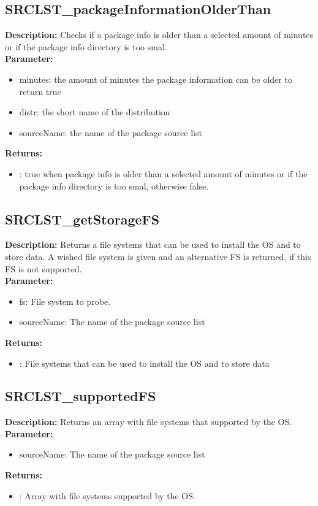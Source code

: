 \subsection{SRCLST\_packageInformationOlderThan}
\textbf{Description:} Checks if a package info is older than a selected amount of minutes or if the package info directory is too smal.\\
\textbf{Parameter:}
\begin{itemize}
\item minutes: the amount of minutes the package information can be older to return true
\item distr: the short name of the distribution
\item sourceName: the name of the package source list
\end{itemize}
\textbf{Returns:}
\begin{itemize}
\item : true when package info is older than a selected amount of minutes or if the package info directory is too smal, otherwise false.
\end{itemize}

\subsection{SRCLST\_getStorageFS}
\textbf{Description:} Returns a file systems that can be used to install the OS and to store data. A wished file system is given and an alternative FS is returned, if this FS is not supported.\\
\textbf{Parameter:}
\begin{itemize}
\item fs: File system to probe.
\item sourceName: The name of the package source list
\end{itemize}
\textbf{Returns:}
\begin{itemize}
\item : File systems that can be used to install the OS and to store data
\end{itemize}

\subsection{SRCLST\_supportedFS}
\textbf{Description:} Returns an array with file systems that supported by the OS.\\
\textbf{Parameter:}
\begin{itemize}
\item sourceName: The name of the package source list
\end{itemize}
\textbf{Returns:}
\begin{itemize}
\item : Array with file systems supported by the OS.
\end{itemize}

